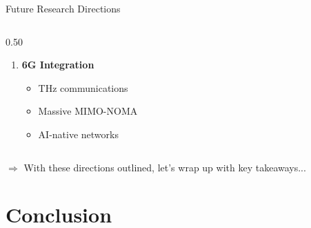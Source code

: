 \documentclass[aspectratio=169]{beamer}
\begin{document}
\begin{frame}{Future Research Directions}
\begin{columns}[T]
\begin{column}{0.50\textwidth}
\begin{enumerate}
                \item \textbf{6G Integration}
                \begin{itemize}\itemsep0em
                    \item THz communications
                    \item Massive MIMO-NOMA
                    \item AI-native networks
                \end{itemize}
            \end{enumerate}
        \end{column}
    \end{columns}
    
    \vspace{0.1cm}
    \small \textcolor{iiitblue}{$\Rightarrow$ With these directions outlined, let's wrap up with key takeaways...}
\end{frame}

\section{Conclusion}
\end{document}

